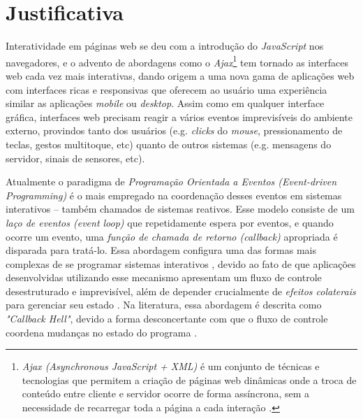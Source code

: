 \section{Justificativa}\label{ljustificativa}

Interatividade em páginas web se deu com a
introdução do \emph{JavaScript} nos navegadores,
e o advento de abordagens como o \emph{Ajax}\footnote{
  \emph{Ajax (Asynchronous JavaScript + XML)} é um
  conjunto de técnicas e tecnologias que permitem a
  criação de páginas web dinâmicas onde a troca de
  conteúdo entre cliente e servidor ocorre de forma
  assíncrona, sem a necessidade de recarregar toda
  a página a cada interação \cite{garrett2005ajax}.
}
tem tornado as interfaces web cada vez mais interativas,
dando origem a uma nova gama de aplicações web com interfaces
ricas e responsivas que oferecem ao usuário uma experiência
similar as aplicações \emph{mobile} ou \emph{desktop}.
Assim como em qualquer interface gráfica, interfaces web
precisam reagir a vários eventos imprevisíveis do ambiente
externo, provindos tanto dos usuários (e.g. \emph{clicks}
do \emph{mouse}, pressionamento de teclas, gestos multitoque,
etc) quanto de outros sistemas (e.g. mensagens do servidor,
sinais de sensores, etc).

Atualmente o paradigma de \emph{Programação Orientada a Eventos
(Event-driven Programming)} é o mais empregado na
coordenação desses eventos em sistemas interativos
-- também chamados de sistemas reativos.
Esse modelo consiste de um \emph{laço de eventos (event loop)}
que repetidamente espera por eventos, e quando ocorre um
evento, uma \emph{função de chamada de retorno (callback)}
apropriada é disparada para tratá-lo.
Essa abordagem configura uma das formas mais complexas de se
programar sistemas interativos \cite{
  edwards2009coherent,
  fischer2007tasks,
  maier2010deprecating,
  reppy1992higher},
devido ao fato de que aplicações desenvolvidas utilizando
esse mecanismo apresentam um fluxo de controle desestruturado
e imprevisível, além de depender crucialmente de
\emph{efeitos colaterais\footnotemark} para
gerenciar seu estado \cite{
  meyerovich2009flapjax,
  muller2015interactive,
  muller2015practical}.
Na literatura, essa abordagem é descrita como \emph{"Callback Hell"},
devido a forma desconcertante com que o fluxo de controle coordena
mudanças no estado do programa \cite[p.~2]{edwards2009coherent}.

